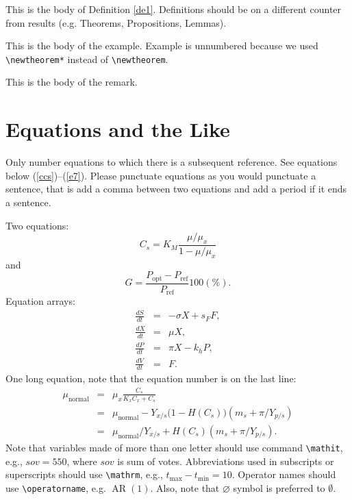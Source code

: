 \documentclass[rbe,wwwview]{econbr}
\begin{document}
\begin{definition}\label{de1}
This is the body of Definition \ref{de1}. Definitions should be on a different counter from results (e.g. Theorems, Propositions, Lemmas).
\end{definition}

\begin{example}
This is the body of the example. Example is unnumbered because we used \verb|\newtheorem*| instead of \verb|\newtheorem|.
\end{example}

\begin{remark}
This is the body of the remark. 
\end{remark}

\section{Equations and the Like}
Only number equations to which there is a subsequent reference. See equations below (\ref{ccs})--(\ref{e7}). Please punctuate equations as you would punctuate a sentence, that is add a comma between two equations and add a period if it ends a sentence.

Two equations:
\begin{equation}
    C_{s}  =  K_{M} \frac{\mu/\mu_{x}}{1-\mu/\mu_{x}} \label{ccs}
\end{equation}
and
\begin{equation}
    G = \frac{P_{\mathrm{opt}} - P_{\mathrm{ref}}}{P_{\mathrm{ref}}}  100(\%).
\end{equation}
Equation arrays:
\begin{eqnarray}
  \frac{dS}{dt} & = & - \sigma X + s_{F} F,\\
  \frac{dX}{dt} & = &   \mu    X,\\
  \frac{dP}{dt} & = &   \pi    X - k_{h} P,\\
  \frac{dV}{dt} & = &   F.
\end{eqnarray}
One long equation, note that the equation number is on the last line:
\begin{eqnarray}
 \mu_{\text{normal}} & = & \mu_{x} \frac{C_{s}}{K_{x}C_{x}+C_{s}}  \nonumber\\
                     & = & \mu_{\text{normal}} - Y_{x/s}\bigl(1-H(C_{s})\bigr)(m_{s}+\pi /Y_{p/s})\nonumber\\
                     & = & \mu_{\text{normal}}/Y_{x/s}+ H(C_{s}) (m_{s}+ \pi /Y_{p/s}).\label{e7}
\end{eqnarray}
Note that variables made of more than one letter should use command \verb|\mathit|, e.g., $\mathit{sov}=550$, where $\mathit{sov}$ is sum of votes. Abbreviations used in subscripts or superscripts should use \verb|\mathrm|, e.g., $t_{\mathrm{max}}-t_{\mathrm{min}} =10$. Operator names should use \verb|\operatorname|, e.g. $\operatorname{AR}(1)$. Also, note that $\varnothing$ symbol is preferred to $\emptyset$.
\end{document}

